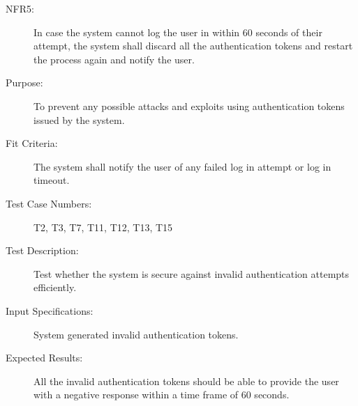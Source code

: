 \documentclass[a4paper,twoside,phd]{BYUPhys}
\begin{document}
\begin{description}
\item[NFR5:] In case the system cannot log the user in within 60 seconds of their attempt, the system shall discard all the authentication tokens and restart the process again and notify the user.
\item[Purpose:] To prevent any possible attacks and exploits using authentication tokens issued by the system.
\item[Fit Criteria:] The system shall notify the user of any failed log in attempt or log in timeout.
\item[Test Case Numbers:] T2, T3, T7, T11, T12, T13, T15
\item[Test Description:] Test whether the system is secure against invalid authentication attempts efficiently.
\item[Input Specifications:] System generated invalid authentication tokens. 
\item[Expected Results:] All the invalid authentication tokens should be able to provide the user with a negative response within a time frame of 60 seconds.

\end{description}
\end{document}
